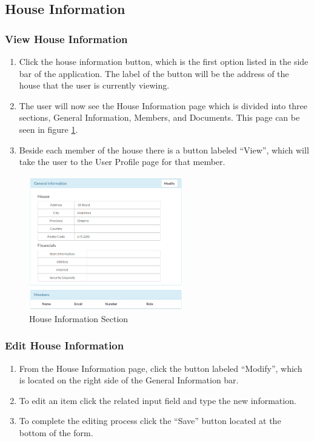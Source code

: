 \documentclass[12pt]{article}
\begin{document}
    \subsection{House Information} %
    \subsubsection{View House Information}
    \begin{enumerate}
        \item Click the house information button, which is the first option listed in the side bar of the application. The label of the button will be the address of the house that the user is currently viewing.
        \item The user will now see the House Information page which is divided into three sections, General Information, Members, and Documents. This page can be seen in figure \ref{fig:house_information}.
        \item Beside each member of the house there is a button labeled ``View'', which will take the user to the User Profile page for that member.
    \end{enumerate}

    \begin{figure}
        \centering
        \includegraphics[width=0.6\textwidth]{house_information}
        \caption{House Information Section}
        \label{fig:house_information}
    \end{figure}

    \subsubsection{Edit House Information}
    \begin{enumerate}
        \item From the House Information page, click the button labeled ``Modify'', which is located on the right side of the General Information bar.
        \item To edit an item click the related input field and type the new information.
        \item To complete the editing process click the ``Save'' button located at the bottom of the form.
    \end{enumerate}
\end{document}
